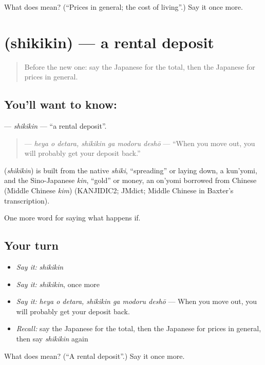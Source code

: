 \begin{tcolorbox}[breakable,colback=teal!4,colframe=teal!35!black,title={Before you move on}]
What does  mean? (\textquotedblleft{}Prices in general; the cost of living\textquotedblright{}.) Say it once more.
\end{tcolorbox}
\section[\texorpdfstring{\ja{しききん} (shikikin)}{しききん (shikikin)}]{ (shikikin) — a rental deposit}

\label{lesson:JA-C362-shikikin}



\begin{quote}
Before the new one: say the Japanese for the total, then the Japanese for prices in general.
\end{quote}

\subsection*{You'll want to know: }
\textbf{} — \emph{shikikin} — \textquotedblleft{}a rental deposit\textquotedblright{}.

\begin{quote}
\textbf{  } — \emph{heya o detara, shikikin ga modoru deshō} — \textquotedblleft{}When you move out, you will probably get your deposit back.\textquotedblright{}
\end{quote}

\begin{cousinweb}
\textbf{} (\emph{shikikin}) is built from the native \emph{shiki}, \textquotedblleft{}spreading\textquotedblright{} or laying down, a kun'yomi, and the Sino-Japanese \emph{kin}, \textquotedblleft{}gold\textquotedblright{} or money, an on'yomi borrowed from Chinese (Middle Chinese \emph{kim}) (KANJIDIC2; JMdict; Middle Chinese in Baxter's transcription).
\end{cousinweb}

\begin{grammarlens}[title={What you've built}]
One more word for saying what happens if.
\end{grammarlens}

\subsection*{Your turn}
\begin{itemize}
\raggedright
  \item \emph{Say it:} \emph{shikikin}
  \item \emph{Say it:} \emph{shikikin}, once more
  \item \emph{Say it:} \emph{heya o detara, shikikin ga modoru deshō} — When you move out, you will probably get your deposit back.
  \item \emph{Recall:} say the Japanese for the total, then the Japanese for prices in general, then say \emph{shikikin} again
\end{itemize}

\begin{tcolorbox}[breakable,colback=teal!4,colframe=teal!35!black,title={Before you move on}]
What does  mean? (\textquotedblleft{}A rental deposit\textquotedblright{}.) Say it once more.
\end{tcolorbox}
